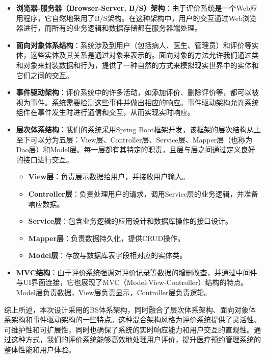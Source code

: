\begin{itemize}
	\item \textbf{浏览器-服务器（Browser-Server, B/S）架构}：由于评价系统是一个Web应用程序，它自然地采用了B/S架构。在这种架构中，用户的交互通过Web浏览器进行，而所有的业务逻辑和数据存储都在服务器端处理。
	
	\item \textbf{面向对象体系结构}：系统涉及到用户（包括病人、医生、管理员）和评价等实体，这些实体及其关系是通过对象来表示的。面向对象的方法允许我们通过类和对象来封装数据和行为，提供了一种自然的方式来模拟现实世界中的实体和它们之间的交互。
	
	\item \textbf{事件驱动架构}：评价系统中的许多活动，如添加评价、删除评价等，都可以被视为事件。系统需要检测这些事件并做出相应的响应。事件驱动架构允许系统组件在事件发生时进行通信和交互，从而实现实时响应。
	
	\item \textbf{层次体系结构}：我们的系统采用Spring Boot框架开发，该框架的层次结构从上至下可以分为五层：View层、Controller层、Service层、Mapper层（也称为Dao层）和Model层。每一层都有其特定的职责，且层与层之间通过定义良好的接口进行交互。
	
	\begin{itemize}
		\item \textbf{View层}：负责展示数据给用户，并接收用户输入。
		\item \textbf{Controller层}：负责处理用户的请求，调用Service层的业务逻辑，并准备响应数据。
		\item \textbf{Service层}：包含业务逻辑的应用设计和数据库操作的接口设计。
		\item \textbf{Mapper层}：负责数据持久化，提供CRUD操作。
		\item \textbf{Model层}：存放与数据库表字段相对应的实体类。
	\end{itemize}
	
	\item \textbf{MVC结构}：由于评价系统强调对评价记录等数据的增删改查，并通过中间件与UI界面连接，它也展现了MVC（Model-View-Controller）结构的特点。Model层负责数据，View层负责显示，Controller层负责逻辑。
\end{itemize}

综上所述，本次设计采用的BS体系架构，同时融合了层次体系架构、面向对象体系架构和事件驱动架构的一些特点。这种混合架构风格为评价系统提供了灵活性、可维护性和可扩展性，同时也确保了系统的实时响应能力和用户交互的直观性。通过这种方式，我们的评价系统能够高效地处理用户评价，提升医疗预约管理系统的整体性能和用户体验。



